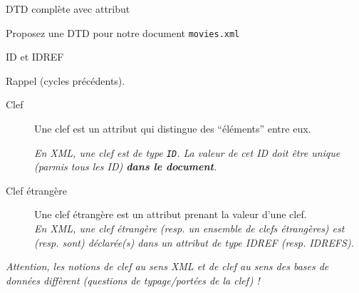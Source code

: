 \begin{frame}[containsverbatim]{DTD complète avec attribut}




\begin{exoblock}
Proposez une DTD pour notre document \texttt{movies.xml}
\end{exoblock}
\end{frame}

\begin{frame}{ID et IDREF}

Rappel (cycles précédents).\\

\begin{description}
\item[Clef] Une clef est un attribut qui distingue des ``éléments'' entre eux. \\

{\it En XML, une clef est de type \verb?ID?. La valeur de cet ID doit \^etre unique (parmis tous les ID) \textbf{dans le document}.}

\item[Clef étrangère] Une clef étrangère est un attribut prenant la valeur d’une clef. \\

{\it En XML, une clef étrangère (resp. un ensemble de clefs étrangères) est (resp. sont) déclarée(s) dans un attribut de type IDREF (resp. IDREFS).}
\end{description}

\bigskip

{\it Attention, les notions de clef au sens XML et de clef au sens des bases de données diffèrent (questions de typage/portées de la clef) !}
\end{frame}

